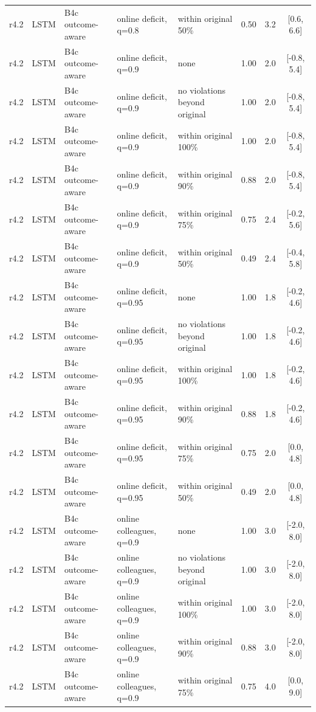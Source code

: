 \begin{longtable}{lllp{4.2cm}p{3.4cm}ccc}
r4.2 & LSTM & B4c outcome-aware & online deficit, q=0.8 & within original 50\% & 0.50 & 3.2 & [0.6, 6.6] \\
r4.2 & LSTM & B4c outcome-aware & online deficit, q=0.9 & none & 1.00 & 2.0 & [-0.8, 5.4] \\
r4.2 & LSTM & B4c outcome-aware & online deficit, q=0.9 & no violations beyond original & 1.00 & 2.0 & [-0.8, 5.4] \\
r4.2 & LSTM & B4c outcome-aware & online deficit, q=0.9 & within original 100\% & 1.00 & 2.0 & [-0.8, 5.4] \\
r4.2 & LSTM & B4c outcome-aware & online deficit, q=0.9 & within original 90\% & 0.88 & 2.0 & [-0.8, 5.4] \\
r4.2 & LSTM & B4c outcome-aware & online deficit, q=0.9 & within original 75\% & 0.75 & 2.4 & [-0.2, 5.6] \\
r4.2 & LSTM & B4c outcome-aware & online deficit, q=0.9 & within original 50\% & 0.49 & 2.4 & [-0.4, 5.8] \\
r4.2 & LSTM & B4c outcome-aware & online deficit, q=0.95 & none & 1.00 & 1.8 & [-0.2, 4.6] \\
r4.2 & LSTM & B4c outcome-aware & online deficit, q=0.95 & no violations beyond original & 1.00 & 1.8 & [-0.2, 4.6] \\
r4.2 & LSTM & B4c outcome-aware & online deficit, q=0.95 & within original 100\% & 1.00 & 1.8 & [-0.2, 4.6] \\
r4.2 & LSTM & B4c outcome-aware & online deficit, q=0.95 & within original 90\% & 0.88 & 1.8 & [-0.2, 4.6] \\
r4.2 & LSTM & B4c outcome-aware & online deficit, q=0.95 & within original 75\% & 0.75 & 2.0 & [0.0, 4.8] \\
r4.2 & LSTM & B4c outcome-aware & online deficit, q=0.95 & within original 50\% & 0.49 & 2.0 & [0.0, 4.8] \\
r4.2 & LSTM & B4c outcome-aware & online colleagues, q=0.9 & none & 1.00 & 3.0 & [-2.0, 8.0] \\
r4.2 & LSTM & B4c outcome-aware & online colleagues, q=0.9 & no violations beyond original & 1.00 & 3.0 & [-2.0, 8.0] \\
r4.2 & LSTM & B4c outcome-aware & online colleagues, q=0.9 & within original 100\% & 1.00 & 3.0 & [-2.0, 8.0] \\
r4.2 & LSTM & B4c outcome-aware & online colleagues, q=0.9 & within original 90\% & 0.88 & 3.0 & [-2.0, 8.0] \\
r4.2 & LSTM & B4c outcome-aware & online colleagues, q=0.9 & within original 75\% & 0.75 & 4.0 & [0.0, 9.0] \\

\end{longtable}
